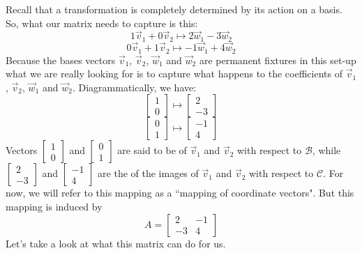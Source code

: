 \documentclass{ximera}
\begin{document}
\begin{exploration}
Recall that a transformation is completely determined by its action on a basis.  So, what our matrix needs to capture is this:
$$1\vec{v}_1+0\vec{v}_2\mapsto 2\vec{w}_1-3\vec{w}_2$$
$$0\vec{v}_1+1\vec{v}_2\mapsto -1\vec{w}_1+4\vec{w}_2$$
Because the bases vectors $\vec{v}_1$, $\vec{v}_2$, $\vec{w}_1$ and $\vec{w}_2$ are permanent fixtures in this set-up what we are really looking for is to capture what happens to the coefficients of $\vec{v}_1$, $\vec{v}_2$, $\vec{w}_1$ and $\vec{w}_2$.   Diagrammatically, we have:
$$\begin{bmatrix}1\\0\end{bmatrix}\mapsto\begin{bmatrix}2\\-3\end{bmatrix}$$
$$\begin{bmatrix}0\\1\end{bmatrix}\mapsto\begin{bmatrix}-1\\4\end{bmatrix}$$
Vectors $\begin{bmatrix}1\\0\end{bmatrix}$ and $\begin{bmatrix}0\\1\end{bmatrix}$ are said to be  of $\vec{v}_1$ and $\vec{v}_2$ with respect to $\mathcal{B}$, while $\begin{bmatrix}2\\-3\end{bmatrix}$ and $\begin{bmatrix}-1\\4\end{bmatrix}$ are the  of the images of $\vec{v}_1$ and $\vec{v}_2$ with respect to  $\mathcal{C}$. For now, we will refer to this mapping as a ``mapping of coordinate vectors".  But this mapping is induced by 
$$A=\begin{bmatrix}2&-1\\-3&4\end{bmatrix}$$
Let's take a look at what this matrix can do for us.


\end{exploration}
\end{document}
